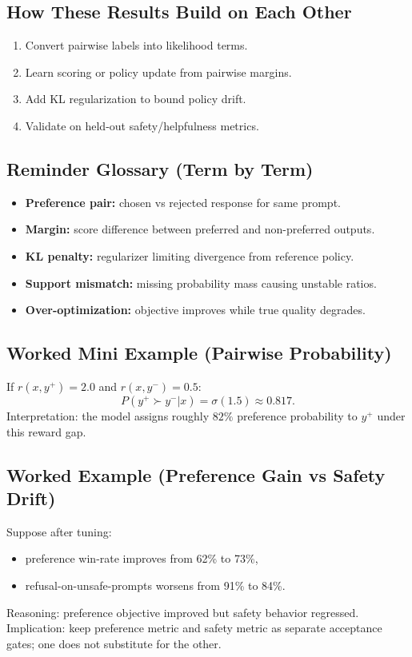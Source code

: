 \subsection*{How These Results Build on Each Other}
\begin{enumerate}[leftmargin=1.5em]
  \item Convert pairwise labels into likelihood terms.
  \item Learn scoring or policy update from pairwise margins.
  \item Add KL regularization to bound policy drift.
  \item Validate on held-out safety/helpfulness metrics.
\end{enumerate}

\subsection*{Reminder Glossary (Term by Term)}
\begin{itemize}[leftmargin=1.5em]
  \item \textbf{Preference pair:} chosen vs rejected response for same prompt.
  \item \textbf{Margin:} score difference between preferred and non-preferred outputs.
  \item \textbf{KL penalty:} regularizer limiting divergence from reference policy.
  \item \textbf{Support mismatch:} missing probability mass causing unstable ratios.
  \item \textbf{Over-optimization:} objective improves while true quality degrades.
\end{itemize}

\subsection*{Worked Mini Example (Pairwise Probability)}
If $r(x,y^+)=2.0$ and $r(x,y^-)=0.5$:
\[
P(y^+\succ y^-|x)=\sigma(1.5)\approx0.817.
\]
Interpretation: the model assigns roughly $82\%$ preference probability to $y^+$ under this reward gap.

\subsection*{Worked Example (Preference Gain vs Safety Drift)}
Suppose after tuning:
\begin{itemize}[leftmargin=1.5em]
  \item preference win-rate improves from 62\% to 73\%,
  \item refusal-on-unsafe-prompts worsens from 91\% to 84\%.
\end{itemize}
Reasoning: preference objective improved but safety behavior regressed.  
Implication: keep preference metric and safety metric as separate acceptance gates; one does not substitute for the other.

